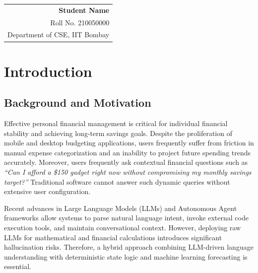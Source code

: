 \documentclass[12pt,a4paper,oneside]{report}
\begin{document}
\noindent \begin{tabular}{@{}r}
\textbf{Student Name} \\
Roll No. 210050000 \\
Department of CSE, IIT Bombay \\
\end{tabular}

\newpage

\tableofcontents
\newpage
\listoffigures
\newpage
\listoftables
\newpage


\chapter{Introduction}
\label{chap:intro}

\section{Background and Motivation}
Effective personal financial management is critical for individual financial stability and achieving long-term savings goals. Despite the proliferation of mobile and desktop budgeting applications, users frequently suffer from friction in manual expense categorization and an inability to project future spending trends accurately. Moreover, users frequently ask contextual financial questions such as \textit{``Can I afford a \$150 gadget right now without compromising my monthly savings target?''} Traditional software cannot answer such dynamic queries without extensive user configuration.

Recent advances in Large Language Models (LLMs) and Autonomous Agent frameworks allow systems to parse natural language intent, invoke external code execution tools, and maintain conversational context. However, deploying raw LLMs for mathematical and financial calculations introduces significant hallucination risks. Therefore, a hybrid approach combining LLM-driven language understanding with deterministic state logic and machine learning forecasting is essential.
\end{document}
